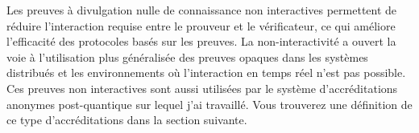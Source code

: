 Les preuves à divulgation nulle de connaissance non interactives permettent de réduire l'interaction
requise entre le prouveur et le vérificateur, ce qui améliore l'efficacité des protocoles basés sur
les preuves.
La non-interactivité a ouvert la voie à l'utilisation plus généralisée des preuves opaques dans les
systèmes distribués et les environnements où l'interaction en temps réel n'est pas possible.
Ces preuves non interactives sont aussi utilisées par le système d’accréditations anonymes post-quantique sur lequel j’ai travaillé.
Vous trouverez une définition de ce type d’accréditations dans la section suivante.








